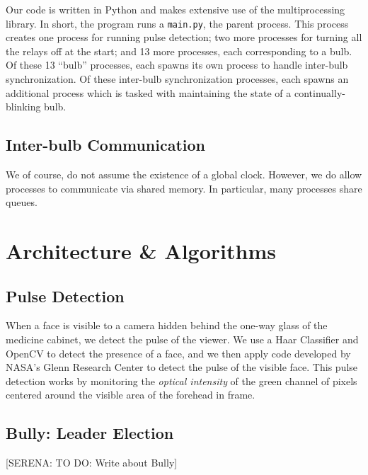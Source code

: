 \documentclass[preprint,review,12pt]{cs262}
\newcommand{\note}[3]{{\color{#2}[#1: #3]}}
\newcommand{\SERENA}[1]{\note{SERENA}{red}{#1}}
\begin{document}
Our code is written in Python and makes extensive use of the multiprocessing library. In short, the program runs a \texttt{main.py}, the parent process. This process creates one process for running pulse detection; two more processes for turning all the relays off at the start; and 13 more processes, each corresponding to a bulb. Of these 13 ``bulb'' processes, each spawns its own process to handle inter-bulb synchronization. Of these inter-bulb synchronization processes, each spawns an additional process which is tasked with maintaining the state of a continually-blinking bulb. 

\subsection{Inter-bulb Communication}

We of course, do not assume the existence of a global clock. However, we do allow processes to communicate via shared memory. In particular, many processes share queues.  

\section{Architecture \& Algorithms}

\subsection{Pulse Detection} 

When a face is visible to a camera hidden behind the one-way glass of the medicine cabinet, we detect the pulse of the viewer. We use a Haar Classifier and OpenCV to detect the presence of a face, and we then apply code developed by NASA's Glenn Research Center\cite{NASA} to detect the pulse of the visible face. This pulse detection works by monitoring the \emph{optical intensity} of the green channel of pixels centered around the visible area of the forehead in frame. 

\subsection{Bully: Leader Election}

\SERENA{TO DO: Write about Bully}
\end{document}
